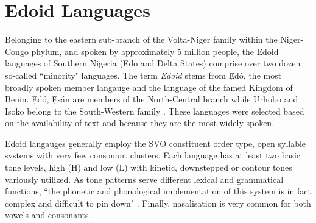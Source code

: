 \documentclass{article} %
\begin{document}

\section{Edoid Languages}


Belonging to the eastern sub-branch of the Volta-Niger family within the Niger-Congo phylum, and spoken by approximately 5 million people, the Edoid languages of Southern Nigeria (Edo and Delta States) comprise over two dozen so-called ``minority" languages. The term \emph{Edoid} stems from \d{\`E}d{\'o}, the most broadly spoken member langauge and the language of the famed Kingdom of Benin. \d{\`E}d{\'o}, \d{\`E}s{\'a}n are members of the North-Central branch while Urhobo and Isoko belong to the South-Western family \citep{ethnologue_2019}. These languages were selected based on the availability of text and because they are the most widely spoken.

Edoid langauges generally employ the SVO constituent order type, open syllable systems with very few consonant clusters. Each language has at least two basic tone levels, high (H) and low (L) with kinetic, downstepped or contour tones variously utilized. As tone patterns serve different lexical and grammatical functions, ``the phonetic and phonological implementation of this system is in fact complex and difficult to pin down" \citep{rolle2013phonetics, ogie2009multi, adeniyi2010tone, ilolo2013vowel}. Finally, nasalisation is very common for both vowels and consonants \citep{Elugbe_1989, isoko_phonetics, ikoyo2018phonetic}. 

\end{document}
